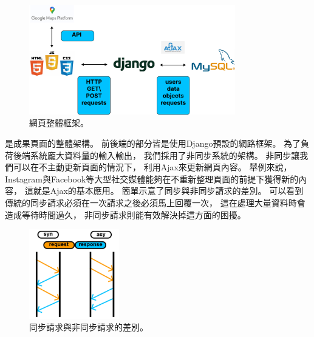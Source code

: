 \documentclass[a4paper,12pt]{extarticle}
\begin{document}
            \begin{figure}[htb]
                \centering
                \includegraphics[width=0.8\textwidth]{webpage.pdf}
                \caption{
                    網頁整體框架。
                }
                \label{fig:webpage}
            \end{figure}
            是成果頁面的整體架構。
            前後端的部分皆是使用Django預設的網路框架。
            為了負荷後端系統龐大資料量的輸入輸出，
            我們採用了非同步系統的架構。
            非同步讓我們可以在不主動更新頁面的情況下，
            利用Ajax來更新網頁內容。
            舉例來說，
            Instagram與Facebook等大型社交媒體能夠在不重新整理頁面的前提下獲得新的內容，
            這就是Ajax的基本應用。
            簡單示意了同步與非同步請求的差別。
            可以看到傳統的同步請求必須在一次請求之後必須馬上回覆一次，
            這在處理大量資料時會造成等待時間過久，
            非同步請求則能有效解決掉這方面的困擾。

            \begin{figure}[htb]
                \centering
                \includegraphics[width=0.35\textwidth]{asynchronous.png}
                \caption{
                    同步請求與非同步請求的差別。
                }
                \label{fig:asynchronous}
            \end{figure}
\end{document}
